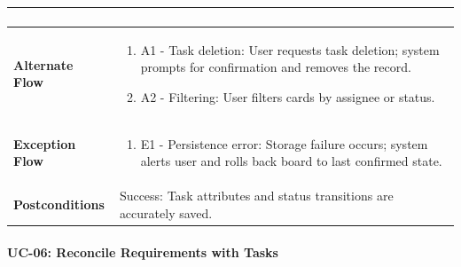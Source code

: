 \begin{longtable}{>{\raggedright\arraybackslash}p{}>{\raggedright\arraybackslash}p{}}
\begin{enumerate}[nosep,leftmargin=*,label=\arabic*.]
\end{enumerate} \\ \hline

\textbf{Alternate Flow} & \begin{enumerate}[nosep,leftmargin=*,label=\arabic*.]

    \item A1 - Task deletion: User requests task deletion; system prompts for confirmation and removes the record.

    \item A2 - Filtering: User filters cards by assignee or status.

\end{enumerate} \\ \hline

\textbf{Exception Flow} & \begin{enumerate}[nosep,leftmargin=*,label=\arabic*.]

    \item E1 - Persistence error: Storage failure occurs; system alerts user and rolls back board to last confirmed state.

\end{enumerate} \\ \hline

\textbf{Postconditions} & Success: Task attributes and status transitions are accurately saved. \\ \hline

\end{longtable}

\endgroup





\paragraph*{UC-06: Reconcile Requirements with Tasks}

\begingroup

\small

\setlength{\tabcolsep}{5pt}

\renewcommand{\arraystretch}{1.1}

